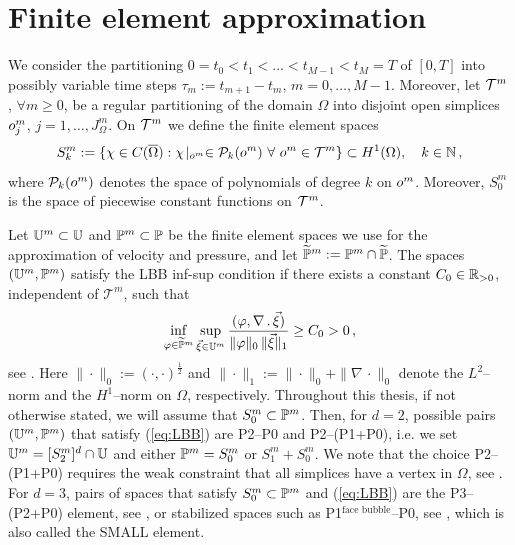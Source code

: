 \section{Finite element approximation}\label{sec:stokes_fem}
We consider the partitioning  $0= t_0 < t_1 < \ldots < t_{M-1} < t_M = T$ of
$[0,T]$ into possibly variable time steps
$\tau_m := t_{m+1}-t_m$, $m=0 ,\ldots, M-1$. Moreover, let
${\cal T}^m$, $\forall m\ge 0$, be a regular partitioning of the domain
$\Omega$ into disjoint open simplices
$o^m_j$, $j = 1 ,\ldots, J^m_\Omega$. On ${\cal T}^m$ we define the
finite element spaces
\begin{equation*}
S^m_k := \{\chi \in C(\overline{\Omega}) : \chi\!\mid_{o^m}
\in \mathcal{P}_k(o^m) \ \forall\ o^m \in {\cal T}^m\}
\subset H^1(\Omega),\quad k \in \mathbb{N}\,,
\end{equation*}
where $\mathcal{P}_k(o^m)$ denotes the space of polynomials of degree $k$
on $o^m$. Moreover, $S^m_0$ is the space of piecewise constant functions
on ${\cal T}^m$.

Let $\mathbb{U}^m\subset\mathbb{U}$ and $\mathbb{P}^m\subset\mathbb{P}$ be the finite
element spaces we use for the approximation of velocity and pressure,
and let $\widetilde{\mathbb{P}}^m:= \mathbb{P}^m \cap \widetilde{\mathbb{P}}$.
The spaces $(\mathbb{U}^m,\mathbb{P}^m)$ satisfy the LBB inf-sup condition if there
exists a constant $C_0 \in {\mathbb R}_{>0}$, independent of $\mathcal{T}^m$, such that
\begin{equation} \label{eq:LBB}
\inf_{\varphi \in \widetilde{\mathbb{P}}^m} \sup_{\vec \xi \in \mathbb{U}^m}
\frac{( \varphi, \nabla \,.\,\vec \xi)} {\|\varphi\|_0\,\|\vec \xi\|_1}
\geq C_0 > 0\,,
\end{equation}
see \cite[p.~114]{GiraultR86}. Here $\|\cdot\|_0 := (\cdot,\cdot)^\frac12$ and
$\|\cdot\|_1 := \|\cdot\|_0 + \|\nabla\,\cdot\|_0$ denote the $L^2$--norm and
the $H^1$--norm on $\Omega$, respectively. Throughout this thesis, if not
otherwise stated, we will assume that $S^m_0\subset\mathbb{P}^m$. Then, for $d=2$,
possible pairs $(\mathbb{U}^m,\mathbb{P}^m)$ that satisfy (\ref{eq:LBB}) are P2--P0
and P2--(P1+P0), i.e. we set $\mathbb{U}^m=[S^m_2]^d\cap\mathbb{U}$ and either
$\mathbb{P}^m = S^m_0$ or $S^m_1+S^m_0$. We note that the choice P2--(P1+P0)
requires the weak constraint that all simplices have a vertex in $\Omega$, see
\cite{BoffiCGG12}. For $d=3$, pairs of spaces that satisfy
$S^m_0\subset\mathbb{P}^m$ and (\ref{eq:LBB}) are the P3--(P2+P0) element, see
\cite{BoffiCGG12}, or stabilized spaces such as P1$^{\mbox{face bubble}}$--P0,
see \cite[Remark~8.7.1]{BoffiBF13}, which is also called the SMALL element.

